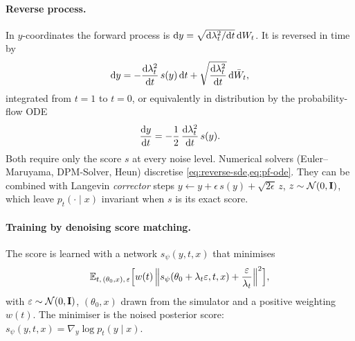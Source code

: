\paragraph{Reverse process.}
In $y$-coordinates the forward process is $\mathrm{d}y=\sqrt{\mathrm{d}\lambda_t^2/\mathrm{d}t}\,\mathrm{d}W_t$.
It is reversed in time by
\begin{equation}\label{eq:reverse-sde}
  \mathrm{d}y=-\frac{\mathrm{d}\lambda_t^2}{\mathrm{d}t}\,s(y)\,\mathrm{d}t+\sqrt{\frac{\mathrm{d}\lambda_t^2}{\mathrm{d}t}}\,\mathrm{d}\bar W_t ,
\end{equation}
integrated from $t=1$ to $t=0$, or equivalently in distribution by the probability-flow ODE
\begin{equation}\label{eq:pf-ode}
  \frac{\mathrm{d}y}{\mathrm{d}t}=-\frac12\,\frac{\mathrm{d}\lambda_t^2}{\mathrm{d}t}\,s(y).
\end{equation}
Both require only the score $s$ at every noise level.
Numerical solvers (Euler--Maruyama, DPM-Solver, Heun) discretise \cref{eq:reverse-sde,eq:pf-ode}.
They can be combined with Langevin \emph{corrector} steps $y\leftarrow y+\epsilon\,s(y)+\sqrt{2\epsilon}\,z$, $z\sim\mathcal{N}(0,\mathbf{I})$, which leave $p_t(\cdot\mid x)$ invariant when $s$ is its exact score.

\paragraph{Training by denoising score matching.}
The score is learned with a network $s_\psi(y,t,x)$ that minimises
\begin{equation}\label{eq:dsm}
  \mathbb{E}_{t,\,(\theta_0,x),\,\varepsilon}\Big[w(t)\,\Big\|s_\psi(\theta_0+\lambda_t\varepsilon,t,x)+\frac{\varepsilon}{\lambda_t}\Big\|^2\Big],
\end{equation}
with $\varepsilon\sim\mathcal{N}(0,\mathbf{I})$, $(\theta_0,x)$ drawn from the simulator and a positive weighting $w(t)$.
The minimiser is the noised posterior score: $s_\psi(y,t,x)=\nabla_y\log p_t(y\mid x)$.


